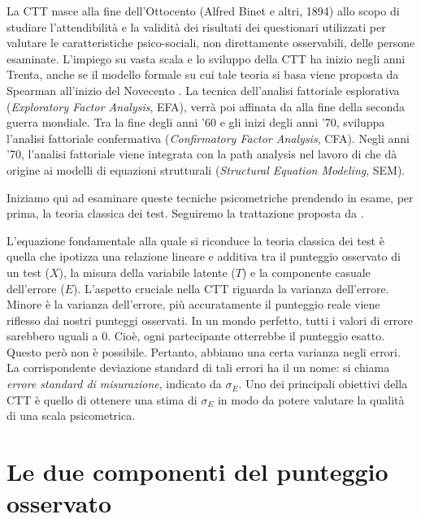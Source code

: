 \documentclass[
  11pt,
]{krantz}
\theoremstyle{definition}
\theoremstyle{definition}
\theoremstyle{definition}
\theoremstyle{definition}
\theoremstyle{remark}
\begin{document}
La CTT nasce alla fine dell'Ottocento (Alfred Binet e altri, 1894) allo scopo di studiare l'attendibilità e la validità dei risultati dei questionari utilizzati per valutare le caratteristiche psico-sociali, non direttamente osservabili, delle persone esaminate. L'impiego su vasta scala e lo sviluppo della CTT ha inizio negli anni Trenta, anche se il modello formale su cui tale teoria si basa viene proposta da Spearman all'inizio del Novecento \citep{ch1904general}. La tecnica dell'analisi fattoriale esplorativa (\emph{Exploratory Factor Analysis}, EFA), verrà poi affinata da \citet{thurstone1947multiple} alla fine della seconda guerra mondiale. Tra la fine degli anni '60 e gli inizi degli anni '70, \citet{joreskog1969general} sviluppa l'analisi fattoriale confermativa (\emph{Confirmatory Factor Analysis}, CFA). Negli anni '70, l'analisi fattoriale viene integrata con la path analysis nel lavoro di \citet{joreskog1978structural} che dà origine ai modelli di equazioni strutturali (\emph{Structural Equation Modeling}, SEM).

Iniziamo qui ad esaminare queste tecniche psicometriche prendendo in esame, per prima, la teoria classica dei test. Seguiremo la trattazione proposta da \citet{lord1968statistical}.

L'equazione fondamentale alla quale si riconduce la teoria classica dei test è quella che ipotizza una relazione lineare e additiva tra il punteggio osservato di un test (\(X\)), la misura della variabile latente (\(T\)) e la componente casuale dell'errore (\(E\)). L'aspetto cruciale nella CTT riguarda la varianza dell'errore. Minore è la varianza dell'errore, più accuratamente il punteggio reale viene riflesso dai nostri punteggi osservati. In un mondo perfetto, tutti i valori di errore sarebbero uguali a 0. Cioè, ogni partecipante otterrebbe il punteggio esatto. Questo però non è possibile. Pertanto, abbiamo una certa varianza negli errori. La corrispondente deviazione standard di tali errori ha il un nome: si chiama \emph{errore standard di misurazione}, indicato da \(\sigma_E\). Uno dei principali obiettivi della CTT è quello di ottenere una stima di \(\sigma_E\) in modo da potere valutare la qualità di una scala psicometrica.

\hypertarget{le-due-componenti-del-punteggio-osservato}{%
\section{Le due componenti del punteggio osservato}\label{le-due-componenti-del-punteggio-osservato}}
\end{document}
